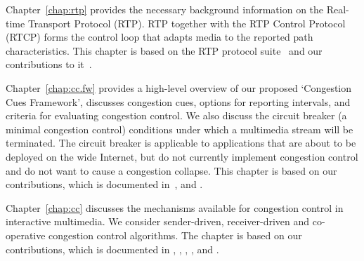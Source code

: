 
Chapter~\ref{chap:rtp} provides the necessary background information on the
Real-time Transport Protocol (RTP). RTP together with the RTP Control Protocol (RTCP)
forms the control loop that adapts media to the reported path characteristics.
This chapter is based on the RTP protocol suite~\cite{rfc3550, rfc4585,
rfc3611, rfc5104, rfc5506} and our contributions to
it~\cite{rfc7097, rfc7005, rfc7243, draft.xr.post.repair, draft.rtcweb.xr, draft.webrtc.stats}.


Chapter~\ref{chap:cc.fw} provides a high-level overview of our proposed
`Congestion Cues Framework', discusses congestion cues, options for reporting
intervals, and criteria for evaluating congestion control. We also discuss the
circuit breaker (a minimal congestion control) conditions under which a
multimedia stream will be terminated. The circuit breaker is applicable to
applications that are about to be deployed on the wide Internet, but do not
currently implement congestion control and do not want to cause a congestion
collapse. This chapter is based on our contributions, which is documented
in~\cite{Singh:control.loops.api, draft.rmcat.app.interaction,
draft.rmcat.evaluate, Singh:PhDFw, draft.rtp.cb, Sarker:CB.lte}, and .



Chapter~\ref{chap:cc} discusses the mechanisms available for congestion
control in interactive multimedia. We consider sender-driven, receiver-driven
and co-operative congestion control algorithms. The chapter is based on our
contributions, which is documented in \cite{daltat:patent}, \cite{singh:2010.thesis}, 
, , and .


